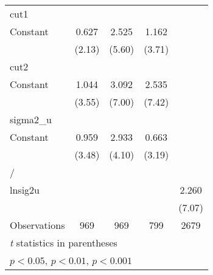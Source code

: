 {\begin{longtable}{l*{4}{c}}
\midrule
cut1            &                  &                  &                  &                  \\
Constant        &    0.627\sym{*}  &    2.525\sym{***}&    1.162\sym{***}&                  \\
                &   (2.13)         &   (5.60)         &   (3.71)         &                  \\
\midrule
cut2            &                  &                  &                  &                  \\
Constant        &    1.044\sym{***}&    3.092\sym{***}&    2.535\sym{***}&                  \\
                &   (3.55)         &   (7.00)         &   (7.42)         &                  \\
\midrule
sigma2\_u        &                  &                  &                  &                  \\
Constant        &    0.959\sym{***}&    2.933\sym{***}&    0.663\sym{**} &                  \\
                &   (3.48)         &   (4.10)         &   (3.19)         &                  \\
\midrule
/               &                  &                  &                  &                  \\
lnsig2u         &                  &                  &                  &    2.260\sym{***}\\
                &                  &                  &                  &   (7.07)         \\
\midrule
Observations    &      969         &      969         &      799         &     2679         \\
\bottomrule
\multicolumn{5}{l}{\footnotesize \textit{t} statistics in parentheses}\\
\multicolumn{5}{l}{\footnotesize \sym{*} \(p<0.05\), \sym{**} \(p<0.01\), \sym{***} \(p<0.001\)}\\
\end{longtable}
}
